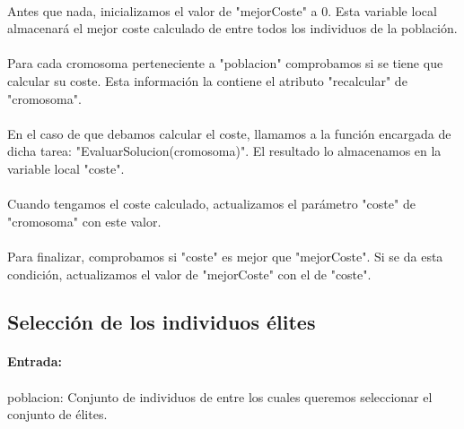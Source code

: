 	\paragraph{}Antes que nada, inicializamos el valor de "mejorCoste" a 0. Esta variable local almacenará el mejor coste calculado de entre todos los individuos de la población.
	
	\paragraph{}Para cada cromosoma perteneciente a "poblacion" comprobamos si se tiene que calcular su coste. Esta información la contiene el atributo "recalcular" de "cromosoma".
	
	\paragraph{}En el caso de que debamos calcular el coste, llamamos a la función encargada de dicha tarea: "EvaluarSolucion(cromosoma)". El resultado lo almacenamos en la variable local "coste".
	
	\paragraph{}Cuando tengamos el coste calculado, actualizamos el parámetro "coste" de "cromosoma"  con este valor.
	
	\paragraph{}Para finalizar, comprobamos si "coste" es mejor que "mejorCoste". Si se da esta condición, actualizamos el valor de "mejorCoste" con el de "coste".
	
	\subsection{Selección de los individuos élites}
	
	\paragraph{Entrada:}
	
	\paragraph{}poblacion: Conjunto de individuos de entre los cuales queremos seleccionar el conjunto de élites.
	

